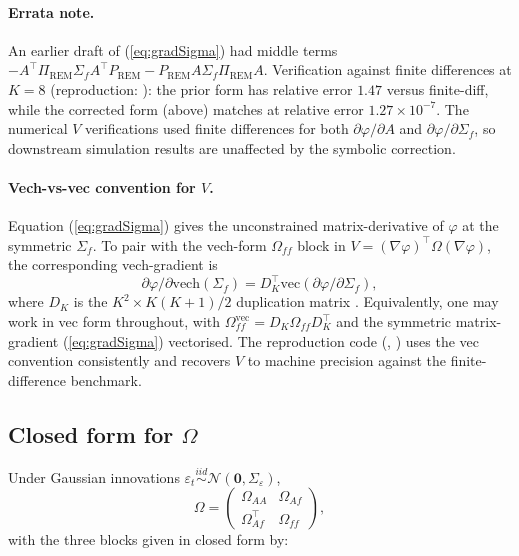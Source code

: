 \documentclass[11pt,letterpaper]{article}
\theoremstyle{remark}
\newcommand{\REM}{\mathrm{REM}}
\newcommand{\Sigmaf}{\Sigma_f}
\newcommand{\Sigmae}{\Sigma_\varepsilon}
\newcommand{\PiREM}{\Pi_{\REM}}
\newcommand{\PREM}{P_{\REM}}
\newcommand{\vech}{\mathrm{vech}}
\begin{document}
\paragraph{Errata note.} An earlier draft of (\ref{eq:gradSigma}) had middle terms $-A^\top \PiREM \Sigmaf A^\top \PREM - \PREM A \Sigmaf \PiREM A$. Verification against finite differences at $K = 8$ (reproduction: ): the prior form has relative error $1.47$ versus finite-diff, while the corrected form (above) matches at relative error $1.27 \times 10^{-7}$. The numerical $V$ verifications used finite differences for both $\partial \varphi / \partial A$ and $\partial \varphi / \partial \Sigmaf$, so downstream simulation results are unaffected by the symbolic correction.

\paragraph{Vech-vs-vec convention for $V$.} Equation (\ref{eq:gradSigma}) gives the unconstrained matrix-derivative of $\varphi$ at the symmetric $\Sigmaf$. To pair with the vech-form $\Omega_{ff}$ block in $V = (\nabla \varphi)^\top \Omega (\nabla \varphi)$, the corresponding vech-gradient is
\[
\partial \varphi / \partial \vech(\Sigmaf) = D_K^\top \mathrm{vec}(\partial \varphi / \partial \Sigmaf),
\]
where $D_K$ is the $K^2 \times K(K+1)/2$ duplication matrix \cite[Appendix~A.12]{Lutkepohl2005}. Equivalently, one may work in vec form throughout, with $\Omega_{ff}^{\mathrm{vec}} = D_K \Omega_{ff} D_K^\top$ and the symmetric matrix-gradient (\ref{eq:gradSigma}) vectorised. The reproduction code (, ) uses the vec convention consistently and recovers $V$ to machine precision against the finite-difference benchmark.

\subsection{\texorpdfstring{Closed form for $\Omega$}{Closed form for Omega}}

Under Gaussian innovations $\varepsilon_t \stackrel{iid}{\sim} \mathcal{N}(\mathbf{0}, \Sigmae)$,
\begin{equation}\label{eq:Omega-block}
\Omega = \begin{pmatrix} \Omega_{AA} & \Omega_{Af} \\ \Omega_{Af}^\top & \Omega_{ff} \end{pmatrix},
\end{equation}
with the three blocks given in closed form by:
\end{document}
